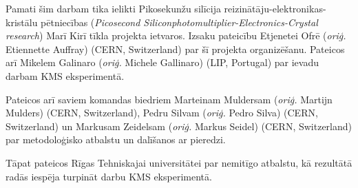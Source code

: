 Pamati šim darbam tika ielikti Pikosekunžu silīcija reizinātāju-elektronikas-kristālu pētniecības (\textit{Picosecond Siliconphotomultiplier-Electronics-Crystal research}) Marī Kirī tīkla projekta ietvaros. Izsaku pateicību Etjenetei Ofrē (\textit{oriģ.} Etiennette Auffray) (CERN, Switzerland) par šī projekta organizēšanu. Pateicos arī Mikelem Galinaro (\textit{oriģ.} Michele Gallinaro) (LIP, Portugal) par ievadu darbam KMS eksperimentā.

Pateicos arī saviem komandas biedriem Marteinam Muldersam (\textit{oriģ.} Martijn Mulders) (CERN, Switzerland), Pedru Silvam (\textit{oriģ.} Pedro Silva) (CERN, Switzerland) un Markusam Zeidelsam (\textit{oriģ.} Markus Seidel) (CERN, Switzerland) par metodoloģisko atbalstu un dalīšanos ar pieredzi.

Tāpat pateicos Rīgas Tehniskajai universitātei par nemitīgo atbalstu, kā rezultātā radās iespēja turpināt darbu KMS eksperimentā.
